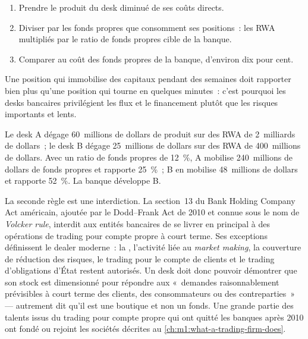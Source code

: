 \begin{method}\label{met:m1:the-sell-side:roc}
\begin{enumerate}
\item Prendre le produit du desk diminué de ses coûts directs.
\item Diviser par les fonds propres que consomment ses positions~: les RWA multipliés par le
  ratio de fonds propres cible de la banque.
\item Comparer au coût des fonds propres de la banque, d'environ dix pour cent.
\end{enumerate}
Une position qui immobilise des capitaux pendant des semaines doit rapporter bien plus
qu'une position qui tourne en quelques minutes~: c'est pourquoi les desks bancaires
privilégient les flux et le financement plutôt que les risques importants et lents.
\end{method}

\begin{example}\label{ex:m1:the-sell-side:twodesks}
Le desk A dégage 60~millions de dollars de produit sur des RWA de 2~milliards de dollars~; le desk B dégage 25~millions de dollars
sur des RWA de 400~millions de dollars. Avec un ratio de fonds propres de 12~\%, A mobilise 240~millions de dollars de fonds propres
et rapporte 25~\%~; B en mobilise 48~millions de dollars et rapporte 52~\%. La banque développe B.
\end{example}

La seconde règle est une interdiction. La section~13 du Bank Holding Company Act américain,
ajoutée par le Dodd--Frank Act de 2010 et connue sous le nom de \emph{Volcker
rule}, interdit aux entités bancaires de se livrer en principal à des opérations de
trading pour compte propre à court terme. Ses exceptions définissent le dealer moderne~: la ,
l'activité liée au \emph{market making}, la couverture de réduction des risques, le trading
pour le compte de clients et le trading d'obligations d'État restent autorisés.
Un desk doit donc pouvoir démontrer que son stock est dimensionné pour répondre aux
«~demandes raisonnablement prévisibles à court terme des clients, des consommateurs ou des
contreparties~» --- autrement dit qu'il est une boutique et non un fonds. Une grande partie des talents issus du trading pour compte propre qui ont quitté les banques après 2010
ont fondé ou rejoint les sociétés décrites au \cref{ch:m1:what-a-trading-firm-does}.


